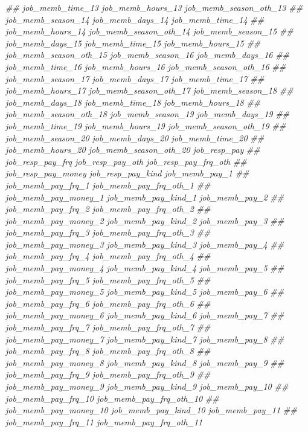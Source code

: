 \documentclass[
]{article}
\newenvironment{Shaded}{\begin{snugshade}}{\end{snugshade}}
\newcommand{\CommentTok}[1]{\textcolor[rgb]{0.56,0.35,0.01}{\textit{#1}}}
\begin{document}
\begin{Shaded}
\begin{Highlighting}[]
\CommentTok{##      job_memb_time_13 job_memb_hours_13 job_memb_season_oth_13}
\CommentTok{##      job_memb_season_14 job_memb_days_14 job_memb_time_14}
\CommentTok{##      job_memb_hours_14 job_memb_season_oth_14 job_memb_season_15}
\CommentTok{##      job_memb_days_15 job_memb_time_15 job_memb_hours_15}
\CommentTok{##      job_memb_season_oth_15 job_memb_season_16 job_memb_days_16}
\CommentTok{##      job_memb_time_16 job_memb_hours_16 job_memb_season_oth_16}
\CommentTok{##      job_memb_season_17 job_memb_days_17 job_memb_time_17}
\CommentTok{##      job_memb_hours_17 job_memb_season_oth_17 job_memb_season_18}
\CommentTok{##      job_memb_days_18 job_memb_time_18 job_memb_hours_18}
\CommentTok{##      job_memb_season_oth_18 job_memb_season_19 job_memb_days_19}
\CommentTok{##      job_memb_time_19 job_memb_hours_19 job_memb_season_oth_19}
\CommentTok{##      job_memb_season_20 job_memb_days_20 job_memb_time_20}
\CommentTok{##      job_memb_hours_20 job_memb_season_oth_20 job_resp_pay}
\CommentTok{##      job_resp_pay_frq job_resp_pay_oth job_resp_pay_frq_oth}
\CommentTok{##      job_resp_pay_money job_resp_pay_kind job_memb_pay_1}
\CommentTok{##      job_memb_pay_frq_1 job_memb_pay_frq_oth_1}
\CommentTok{##      job_memb_pay_money_1 job_memb_pay_kind_1 job_memb_pay_2}
\CommentTok{##      job_memb_pay_frq_2 job_memb_pay_frq_oth_2}
\CommentTok{##      job_memb_pay_money_2 job_memb_pay_kind_2 job_memb_pay_3}
\CommentTok{##      job_memb_pay_frq_3 job_memb_pay_frq_oth_3}
\CommentTok{##      job_memb_pay_money_3 job_memb_pay_kind_3 job_memb_pay_4}
\CommentTok{##      job_memb_pay_frq_4 job_memb_pay_frq_oth_4}
\CommentTok{##      job_memb_pay_money_4 job_memb_pay_kind_4 job_memb_pay_5}
\CommentTok{##      job_memb_pay_frq_5 job_memb_pay_frq_oth_5}
\CommentTok{##      job_memb_pay_money_5 job_memb_pay_kind_5 job_memb_pay_6}
\CommentTok{##      job_memb_pay_frq_6 job_memb_pay_frq_oth_6}
\CommentTok{##      job_memb_pay_money_6 job_memb_pay_kind_6 job_memb_pay_7}
\CommentTok{##      job_memb_pay_frq_7 job_memb_pay_frq_oth_7}
\CommentTok{##      job_memb_pay_money_7 job_memb_pay_kind_7 job_memb_pay_8}
\CommentTok{##      job_memb_pay_frq_8 job_memb_pay_frq_oth_8}
\CommentTok{##      job_memb_pay_money_8 job_memb_pay_kind_8 job_memb_pay_9}
\CommentTok{##      job_memb_pay_frq_9 job_memb_pay_frq_oth_9}
\CommentTok{##      job_memb_pay_money_9 job_memb_pay_kind_9 job_memb_pay_10}
\CommentTok{##      job_memb_pay_frq_10 job_memb_pay_frq_oth_10}
\CommentTok{##      job_memb_pay_money_10 job_memb_pay_kind_10 job_memb_pay_11}
\CommentTok{##      job_memb_pay_frq_11 job_memb_pay_frq_oth_11}

\end{Highlighting}
\end{Shaded}
\end{document}
